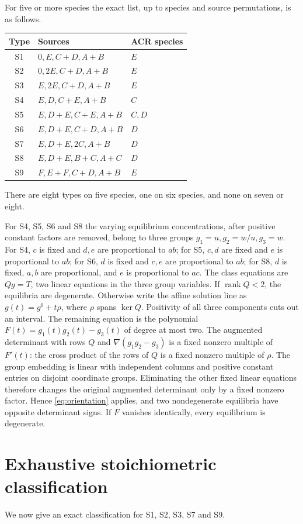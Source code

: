 \documentclass[11pt,a4paper]{report}
\providecommand{\rank}{\operatorname{rank}}
\begin{document}
For five or more species the exact list, up to species and source permutations, is as follows.
\begin{center}
\begin{tabular}{cll}
\toprule
Type & Sources & ACR species\\
\midrule
S1 & $0,E,C+D,A+B$ & $E$\\
S2 & $0,2E,C+D,A+B$ & $E$\\
S3 & $E,2E,C+D,A+B$ & $E$\\
S4 & $E,D,C+E,A+B$ & $C$\\
S5 & $E,D+E,C+E,A+B$ & $C,D$\\
S6 & $E,D+E,C+D,A+B$ & $D$\\
S7 & $E,D+E,2C,A+B$ & $D$\\
S8 & $E,D+E,B+C,A+C$ & $D$\\
S9 & $F,E+F,C+D,A+B$ & $E$\\
\bottomrule
\end{tabular}
\end{center}
There are eight types on five species, one on six species, and none on seven or eight.

For S4, S5, S6 and S8 the varying equilibrium concentrations, after positive constant factors are
removed, belong to three groups $g_1=u,g_2=w/u,g_3=w$. For S4, $c$ is fixed and $d,e$ are
proportional to $ab$; for S5, $c,d$ are fixed and $e$ is proportional to $ab$; for S6, $d$ is fixed
and $c,e$ are proportional to $ab$; for S8, $d$ is fixed, $a,b$ are proportional, and $e$ is
proportional to $ac$. The class equations are $Qg=T$, two linear equations in the three group
variables. If $\rank Q<2$, the equilibria are degenerate. Otherwise write the affine solution line
as $g(t)=g^0+t\rho$, where $\rho$ spans $\ker Q$. Positivity of all three components cuts out an
interval. The remaining equation is the polynomial $F(t)=g_1(t)g_2(t)-g_3(t)$ of degree at most two.
The augmented determinant with rows $Q$ and $\nabla(g_1g_2-g_3)$ is a fixed nonzero multiple of
$F'(t)$: the cross product of the rows of $Q$ is a fixed nonzero multiple of $\rho$.
The group embedding is linear with independent columns and positive constant entries on disjoint
coordinate groups. Eliminating the other fixed linear equations therefore changes the original
augmented determinant only by a fixed nonzero factor. Hence \eqref{eq:orientation} applies, and
two nondegenerate equilibria have opposite determinant signs. If $F$ vanishes identically, every
equilibrium is degenerate.

\section{Exhaustive stoichiometric classification}
We now give an exact classification for S1, S2, S3, S7 and S9.
\end{document}
